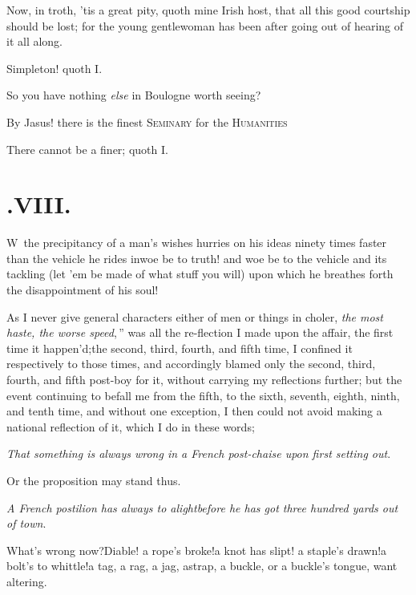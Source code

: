 \documentclass{article}
\begin{document}
\tsh Now, in troth, ’tis a great pity, quoth mine
Irish host, that all this good courtship should be lost; for
the young gentlewoman has been after going out of hearing of it all
along.\tsh

\tsh Simpleton! quoth I.

\tsh So you have nothing \textit{else} in Bou\-logne
worth seeing?

\newpage
\tsk By Jasus! there is the finest \textsc{Seminary} for
the \textsc{Humanities}\tsh

\tsk There cannot be a finer; quoth I.

\section{.\enspace VIII.}

\lettrine{W}{\,} the precipitancy of a
man’s wishes hurries on his ideas ninety times faster than
the vehicle he rides in\tsk woe be to truth! and woe be to the
vehicle and its tackling (let ’em be made of what stuff you
will) upon which he breathes forth the disappointment of his
soul!

As I never give general characters either of men or things in
choler, \lqq\textit{the most haste, the worse speed},\,” was
all the re-\pb flection I made upon the affair, the first time it
happen’d;\tsk the second, third, fourth, and fifth time, I
confined it respectively to those times, and accordingly blamed
only the second, third, fourth, and fifth post-boy for it, without
carrying my reflections further; but the event
continuing to befall me from the fifth, to the sixth, seventh,
eighth, ninth, and tenth time, and without one exception, I then
could not avoid making a national reflection of it, which I do in
these words;

\textit{That something is always wrong in a French post-chaise upon
first setting out}.

Or the proposition may stand thus.

\textit{A French postilion has always to alight\pb before he has got
three hundred yards out of town}.

What’s wrong now?\tsh Diable!\tsh\break
a rope’s broke!\tsh a knot has slipt!\break
\tsh a staple’s drawn!\tsh a bolt’s to whittle!\tsh a tag, a
rag, a jag, a\break strap, a buckle, or a
buckle’s tongue, want altering.\tsh
\end{document}
